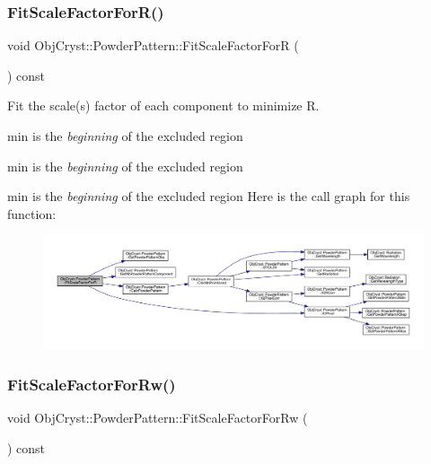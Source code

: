 \subsubsection{\texorpdfstring{FitScaleFactorForR()}{FitScaleFactorForR()}}
{\footnotesize\ttfamily void Obj\+Cryst\+::\+Powder\+Pattern\+::\+Fit\+Scale\+Factor\+ForR (\begin{DoxyParamCaption}{ }\end{DoxyParamCaption}) const}



Fit the scale(s) factor of each component to minimize R. 

min is the {\itshape beginning} of the excluded region

min is the {\itshape beginning} of the excluded region

min is the {\itshape beginning} of the excluded region Here is the call graph for this function\+:
\nopagebreak
\begin{figure}[H]
\begin{center}
\leavevmode
\includegraphics[width=350pt]{class_obj_cryst_1_1_powder_pattern_add7e991dc93dcd85df4fc41fc2e7fc37_cgraph}
\end{center}
\end{figure}
\mbox{\label{class_obj_cryst_1_1_powder_pattern_ab9b4d9f2af1885625fb27c6b1ab7519d}} 
\subsubsection{\texorpdfstring{FitScaleFactorForRw()}{FitScaleFactorForRw()}}
{\footnotesize\ttfamily void Obj\+Cryst\+::\+Powder\+Pattern\+::\+Fit\+Scale\+Factor\+For\+Rw (\begin{DoxyParamCaption}{ }\end{DoxyParamCaption}) const}



